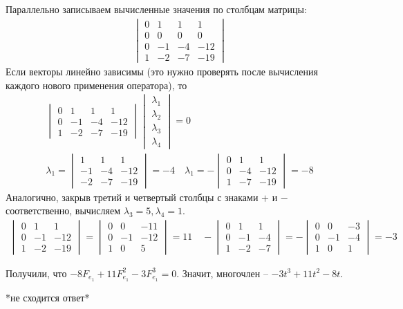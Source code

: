 		Параллельно записываем вычисленные значения по столбцам матрицы:
		\begin{gather*}
			\begin{vmatrix}
				0 & 1 & 1 & 1\\
				0 & 0 & 0 & 0\\ 
				0 & -1 & -4 & -12\\ 
				1 & -2 & -7 & -19
			\end{vmatrix}
		\end{gather*}
		Если векторы линейно зависимы (это нужно проверять после вычисления каждого нового применения оператора), то 
		\begin{gather*}
			\begin{vmatrix}
				0 & 1 & 1 & 1\\
				0 & -1 & -4 & -12\\
				1 & -2 & -7 & -19
			\end{vmatrix}
			\begin{vmatrix}
				\lambda_{1}\\
				\lambda_{2}\\
				\lambda_{3}\\
				\lambda_{4}
			\end{vmatrix}
			= 0
		\\
			\lambda_{1} = 
			\begin{vmatrix}
				1 & 1 & 1\\
				-1 & -4 & -12\\
				-2 & -7 & -19
			\end{vmatrix}
			= -4
		\quad 
			\lambda_{1} = -
			\begin{vmatrix}
				0 & 1 & 1\\
				0 & -4 & -12\\
				1 & -7 & -19
			\end{vmatrix}
			= -8
		\end{gather*}
		Аналогично, закрыв третий и четвертый столбцы с знаками $+$ и $-$ соответственно, вычисляем $\lambda_{3} = 5, \lambda_{4} = 1$.
		\begin{gather*}
			\begin{vmatrix} 
				0 & 1 & 1\\
				0 & -1 & -12\\
				1 & -2 & -19
			\end{vmatrix}
			=
			\begin{vmatrix}
				0 & 0 & -11\\
				0 & -1 & -12\\
				1 & 0 & 5
			\end{vmatrix}
			= 11
		\quad
			-
			\begin{vmatrix} 
				0 & 1 & 1\\
				0 & -1 & -4\\
				1 & -2 & -7
			\end{vmatrix}
			= -
			\begin{vmatrix}
				0 & 0 & -3\\
				0 & -1 & -4\\
				1 & 0 & 1
			\end{vmatrix}
			= -3
		\end{gather*}
		
		Получили, что $-8 F_{e_{1}} + 11 F_{e_{1}}^{2} - 3 F_{e_{1}}^{3} = 0$. Значит, многочлен -- $-3t^{3} + 11t^{2} - 8t$. 
		
		*не сходится ответ* 
		